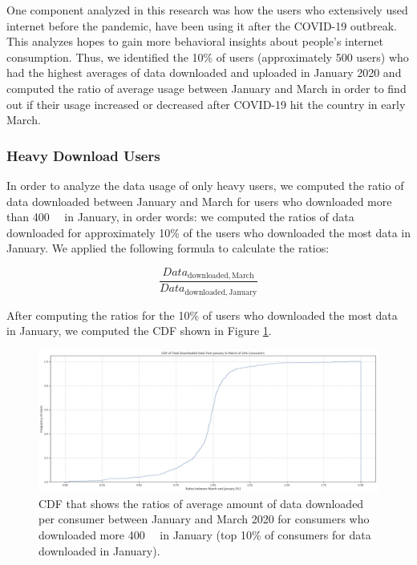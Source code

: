 \documentclass[conference,10pt]{IEEEtran}
\begin{document}
One component analyzed in this research was how the users who extensively used internet before the pandemic, have been using it after the COVID-19 outbreak. This analyzes hopes to gain more behavioral insights about people's internet consumption. Thus, we identified the 10\% of users (approximately 500 users) who had the highest averages of data downloaded and uploaded in January 2020 and computed the ratio of average usage between January and March in order to find out if their usage increased or decreased after COVID-19 hit the country in early March.

\subsubsection{Heavy Download Users}
\label{sec:heavy-download-users}

In order to analyze the data usage of only heavy users, we computed the ratio of data downloaded between January and March for users who downloaded more than \SI{400}{\giga\byte} in January, in order words: we computed the ratios of data downloaded for approximately 10\% of the users who downloaded the most data in January. We applied the following formula to calculate the ratios:

\begin{equation}
\frac{Data_{\text{downloaded},\, \text{March}}}{Data_{\text{downloaded},\, \text{January}}}
\end{equation}


After computing the ratios for the 10\% of users who downloaded the most data in January, we computed the CDF shown in Figure \ref{fig:heavydown}.

\begin{figure}
\centering
\includegraphics[width=1.0\linewidth]{figs/heavydown.PNG}
\caption{CDF that shows the ratios of average amount of data downloaded per consumer between January and March 2020 for consumers who downloaded more \SI{400}{\giga\byte} in January (top 10\% of consumers for data downloaded in January).}
\label{fig:heavydown}
\end{figure}
\end{document}
